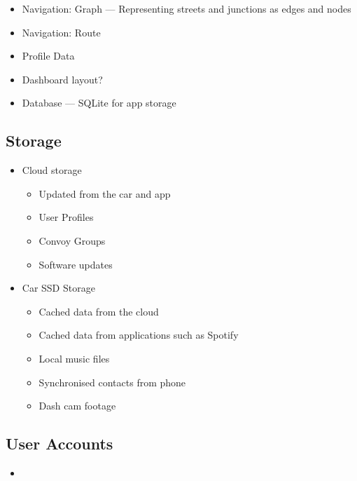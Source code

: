\documentclass{article}
\begin{document}
  \begin{itemize}
      \item Navigation: Graph --- Representing streets and junctions as edges and nodes
      \item Navigation: Route
	  \item Profile Data
      \item Dashboard layout?
      \item Database --- SQLite for app storage    
  \end{itemize}

\subsection{Storage} \label{ssec:storage}
  \begin{itemize}
      \item Cloud storage%
          \begin{itemize}
          	  \item Updated from the car and app
              \item User Profiles
              \item Convoy Groups
              \item Software updates
          \end{itemize}
      \item Car SSD Storage
      \begin{itemize}
      		\item Cached data from the cloud
            \item Cached data from applications such as Spotify
            \item Local music files
            \item Synchronised contacts from phone
            \item Dash cam footage
      \end{itemize}
  \end{itemize}
  
\subsection{User Accounts} \label{ssec:user-accounts}
  \begin{itemize}
  	\item
 \end{itemize} 
  
\end{document}
